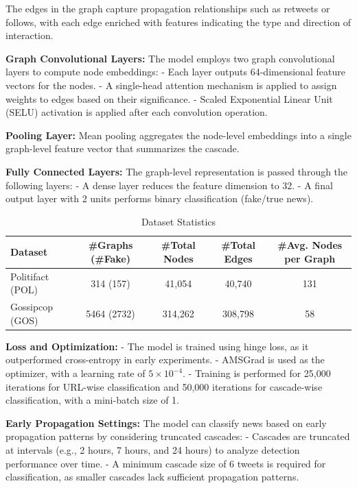 \documentclass[sigconf,nonacm]{acmart}
\begin{document}
The edges in the graph capture propagation relationships such as retweets or follows, with each edge enriched with features indicating the type and direction of interaction.

\textbf{Graph Convolutional Layers:}  
The model employs two graph convolutional layers to compute node embeddings:
- Each layer outputs 64-dimensional feature vectors for the nodes.
- A single-head attention mechanism is applied to assign weights to edges based on their significance.
- Scaled Exponential Linear Unit (SELU) activation is applied after each convolution operation.

\textbf{Pooling Layer:}  
Mean pooling aggregates the node-level embeddings into a single graph-level feature vector that summarizes the cascade.

\textbf{Fully Connected Layers:}  
The graph-level representation is passed through the following layers:
- A dense layer reduces the feature dimension to 32.
- A final output layer with 2 units performs binary classification (fake/true news).
\begin{table}[t]
    \centering
    \caption{Dataset Statistics}
    \begin{tabular}{lcccc}
        \toprule
        \textbf{Dataset} & \textbf{\#Graphs (\#Fake)} & \textbf{\#Total Nodes} & \textbf{\#Total Edges} & \textbf{\#Avg. Nodes per Graph} \\
        \midrule
        Politifact (POL) & 314 (157) & 41,054 & 40,740 & 131 \\
        Gossipcop (GOS)  & 5464 (2732) & 314,262 & 308,798 & 58 \\
        \bottomrule
    \end{tabular}
    \label{tab:data_statistics}
\end{table}
\textbf{Loss and Optimization:}  
- The model is trained using hinge loss, as it outperformed cross-entropy in early experiments.
- AMSGrad is used as the optimizer, with a learning rate of \( 5 \times 10^{-4} \).
- Training is performed for 25,000 iterations for URL-wise classification and 50,000 iterations for cascade-wise classification, with a mini-batch size of 1.

\textbf{Early Propagation Settings:}  
The model can classify news based on early propagation patterns by considering truncated cascades:
- Cascades are truncated at intervals (e.g., 2 hours, 7 hours, and 24 hours) to analyze detection performance over time.
- A minimum cascade size of 6 tweets is required for classification, as smaller cascades lack sufficient propagation patterns.
\end{document}
